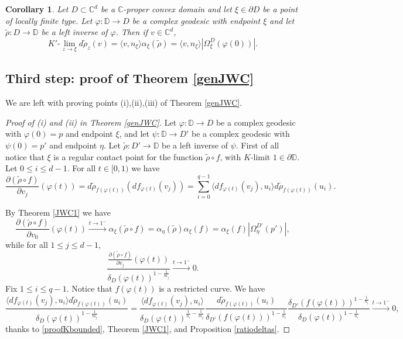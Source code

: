 \documentclass[11pt, reqno]{amsart}
\numberwithin{equation}{section}
\newtheorem{corollary}[theorem]{Corollary}
\theoremstyle{definition}
\newcommand{\C}{\mathbb{C}}
\newcommand{\D}{\mathbb{D}}
\begin{document}
{{{		\begin{corollary}\label{rhoJWC}
			Let $D\subset\C^d$ be a $\C$-proper convex domain and let $\xi\in\partial D$ be a point of locally finite type.
			Let $\varphi\colon\D\to D$ be a complex geodesic with endpoint $\xi$ and let  $\tilde{\rho}\colon D\to \D$ be a  left inverse of $\varphi$. Then if $v\in \C^d$,
			$$K'\textrm{-}\lim_{z\to\xi}d\tilde{\rho}_z(v)=\langle v,n_\xi\rangle\alpha_\xi(\tilde \rho)=\langle v,n_\xi\rangle|\Omega^{D}_\xi(\varphi(0))|.$$
		\end{corollary}
		
		\subsection{Third step: proof of Theorem  \ref{genJWC}}
		We are left with proving points (i),(ii),(iii) of Theorem \ref{genJWC}. 
		\begin{proof}[Proof of (i) and (ii) in Theorem \ref{genJWC}]
			Let $\varphi\colon \D\to D$ be a complex geodesic with $\varphi(0)=p$ and endpoint $\xi$, and let $\psi\colon\D\to D'$ be a complex geodesic with $\psi(0)=p'$ and endpoint $\eta$. Let $\tilde{\rho}\colon D'\to \D$ be a  left inverse of $\psi$. 
			First of all notice that $\xi$ is a regular contact point for the function $\tilde{\rho}\circ f$, with $K$-limit $1\in \partial \D$.
			Let $0\leq i\leq d-1$. For all $t\in [0,1)$ we have
			$$\frac{\partial (\tilde{\rho}\circ f)}{\partial v_j}(\varphi(t))=d\tilde{\rho}_{f(\varphi(t))}( df_{\varphi(t)}(v_j))
			=\sum_{i=0}^{q-1} \langle df_{\varphi(t)}(v_j),u_i   \rangle d\tilde{\rho}_{f(\varphi(t))} (u_i).
			$$
			
			By  Theorem \ref{JWC1} we have
			$$\frac{\partial (\tilde{\rho}\circ f)}{\partial v_0}(\varphi(t))\stackrel{t\to 1^-}\to\alpha_\xi(\tilde{\rho}\circ f)=\alpha_\eta(\tilde{\rho})\alpha_\xi(f)=\alpha_\xi(f)|\Omega_\eta^{D'}(p')|,$$
			while for all $1\leq j\leq d-1$,
			$$\frac{\frac{\partial(\tilde\rho\circ f)}{\partial v_j}(\varphi(t))}{\delta_D(\varphi(t))^{1-\frac{1}{m_j}}}\stackrel{t\to 1^-}\to 0.$$
			Fix $1\leq i\leq q-1$. Notice that $f(\varphi(t))$ is a  restricted curve.
			We have 
			$$\frac{\langle df_{\varphi(t)}(v_j),u_i   \rangle d\tilde{\rho}_{f(\varphi(t))} (u_i)}{{\delta_D(\varphi(t))^{1-\frac{1}{m_j}}}}=\frac{\langle df_{\varphi(t)}(v_j),u_i   \rangle}{\delta_D(\varphi(t))^{\frac{1}{n_i}-\frac{1}{m_j}}}\frac{d\tilde{\rho}_{f(\varphi(t))} (u_i)}{\delta_{D'}(f(\varphi(t)))^{1-\frac{1}{n_i}}}\frac{\delta_{D'}(f(\varphi(t)))^{1-\frac{1}{n_i}}}{\delta_D(\varphi(t))^{1-\frac{1}{n_i}}}\stackrel{t\to 1^-}\longrightarrow 0,$$
			thanks to  \eqref{proofKbounded}, Theorem \ref{JWC1}, and Proposition \ref{ratiodeltas}.
			

\end{proof}}}}
\end{document}
